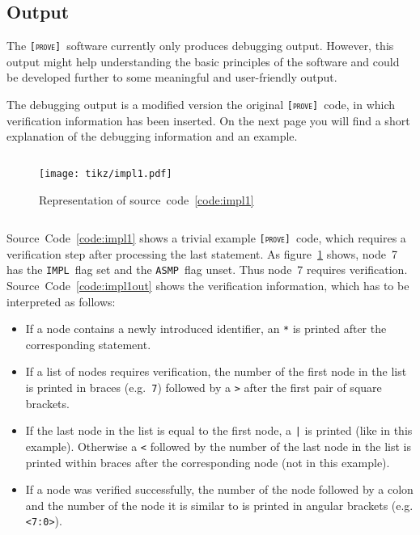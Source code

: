\documentclass[british]{article}
\newenvironment{code}{\captionsetup{type=listing}}{}
\newcommand\prv{bc}
\newcommand\m[1]{\texttt{#1}}
\newcommand\name{\texttt{\textsc{[prove]}}}
\begin{document}
\subsection{Output}

The \name\ software currently only produces debugging output. However, this
output might help understanding the basic principles of the software and could
be developed further to some meaningful and user-friendly output.\newline

The debugging output is a modified version the original \name\ code, in which
verification information has been inserted. On the next page you will find a
short explanation of the debugging information and an example.

\pagebreak{}

\begin{code}
\label{code:impl1}
\inputminted[linenos]{\prv}{examples/impl1.prove}
\end{code}

\begin{figure}[!h]
\caption{Representation of source~code~\ref{code:impl1}}\label{fig:impl1}
\centering
\texttt{[image: tikz/impl1.pdf]}
\end{figure}

\begin{code}
\captionof{listing}{\name\ output for
Source~Code~\ref{code:impl1}}\label{code:impl1out}
\inputminted[linenos]{\prv}{examples/out/impl1.out}
\end{code}

Source~Code~\ref{code:impl1} shows a trivial example \name\ code, which requires
a verification step after processing the last statement. As
figure~\ref{fig:impl1} shows, node~7 has the \texttt{IMPL}~flag set and the
\texttt{ASMP}~flag unset. Thus node~7 requires verification.
Source~Code~\ref{code:impl1out} shows the verification information, which has to
be interpreted as follows:

\begin{itemize}
	\item
		If a node contains a newly introduced identifier, an \m{*} is printed
		after the corresponding statement.
	\item
		If a list of nodes requires verification, the number of the first node
		in the list is printed in braces (e.g.\ \m{{7}}) followed by a \m{>}
		after the first pair of square brackets.
	\item
		If the last node in the list is equal to the first node, a \m{|} is
		printed (like in this example). Otherwise a \m{<} followed by the number
		of the last node in the list is printed within braces after the
		corresponding node (not in this example).
	\item
		If a node was verified successfully, the number of the node followed by
		a colon and the number of the node it is similar to is printed in
		angular brackets (e.g.\m{<7:0>}).
\end{itemize}
\end{document}
